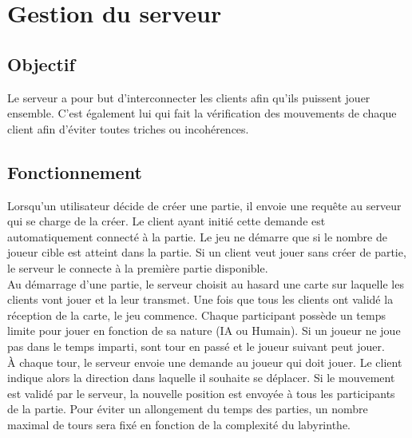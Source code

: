 \chapter{Gestion du serveur}

    \section{Objectif}
        Le serveur a pour but d'interconnecter les clients afin qu'ils puissent jouer ensemble. C'est également lui qui fait la vérification des mouvements de chaque client afin d'éviter toutes triches ou incohérences.

    \section{Fonctionnement}
        Lorsqu'un utilisateur décide de créer une partie, il envoie une requête au serveur qui se charge de la créer. Le client ayant initié cette demande est automatiquement connecté à la partie. Le jeu ne démarre que si le nombre de joueur cible est atteint dans la partie. Si un client veut jouer sans créer de partie, le serveur le connecte à la première partie disponible.\\

        Au démarrage d'une partie, le serveur choisit au hasard une carte sur laquelle les clients vont jouer et la leur transmet. Une fois que tous les clients ont validé la réception de la carte, le jeu commence. Chaque participant possède un temps limite pour jouer en fonction de sa nature (IA ou Humain). Si un joueur ne joue pas dans le temps imparti, sont tour en passé et le joueur suivant peut jouer.\\

        À chaque tour, le serveur envoie une demande au joueur qui doit jouer. Le client indique alors la direction dans laquelle il souhaite se déplacer. Si le mouvement est validé par le serveur, la nouvelle position est envoyée à tous les participants de la partie. Pour éviter un allongement du temps des parties, un nombre maximal de tours sera fixé en fonction de la complexité du labyrinthe.
